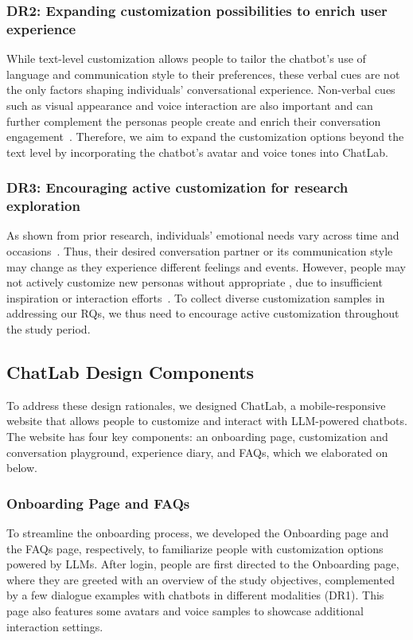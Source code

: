 \subsubsection{DR2: Expanding customization possibilities to enrich user experience} 
While text-level customization allows people to tailor the chatbot's use of language and communication style to their preferences, these verbal cues are not the only factors shaping individuals' conversational experience.
Non-verbal cues such as visual appearance and voice interaction are also important and can further complement the personas people create and enrich their conversation engagement~\cite{Feine2019Taxonomy, Xiao2007Customization}.
Therefore, we aim to expand the customization options beyond the text level by incorporating the chatbot's avatar and voice tones into ChatLab.


\subsubsection{DR3: Encouraging active customization for research exploration} 
As shown from prior research, individuals' emotional needs vary across time and occasions~\cite{mortenson1999cultural}. Thus, their desired conversation partner or its communication style may change as they experience different feelings and events. However, people may not actively customize new personas without appropriate , due to insufficient inspiration or interaction  efforts~\cite{renwen_2021_customization}.
To collect diverse customization samples in addressing our RQs, we thus need to encourage active customization throughout the study period.


\subsection{ChatLab Design Components}
To address these design rationales, we designed ChatLab, a mobile-responsive website that allows people to customize and interact with LLM-powered chatbots. The website has four key components: an onboarding page, customization and conversation playground, experience diary, and FAQs, which we elaborated on below.

\subsubsection{Onboarding Page and FAQs}

To streamline the onboarding process, we developed the Onboarding page and the FAQs page, respectively, to familiarize people with customization options powered by LLMs. 
After login, people are first directed to the Onboarding page, where they are greeted with an overview of the study objectives, complemented by a few dialogue examples with chatbots in different modalities (DR1). This page also features some avatars and voice samples to showcase additional interaction settings.

